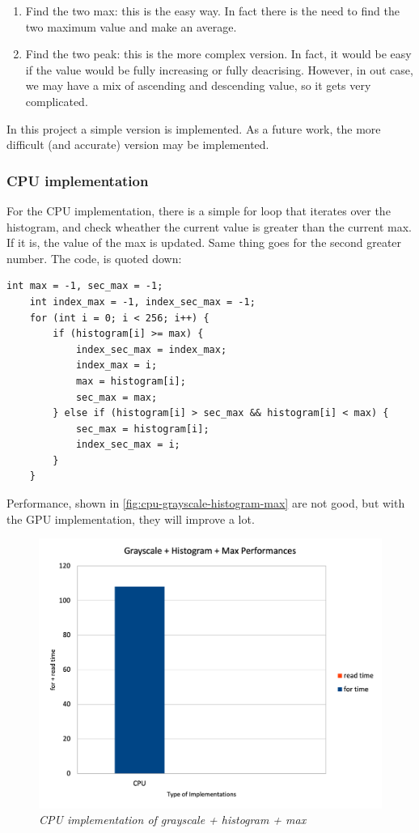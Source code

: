 \documentclass[paper=a4, fontsize=10pt]{scrartcl}	%
\begin{document}
	\begin{enumerate}
		\item Find the two max: this is the easy way. In fact there is the need to find the two maximum value and make an average.
		\item Find the two peak: this is the more complex version. In fact, it would be easy if the value would be fully increasing or fully deacrising. However, in out case, we may have a mix of ascending and descending value, so it gets very complicated.
	\end{enumerate}
				
	In this project a simple version is implemented. As a future work, the more difficult (and accurate) version may be implemented. 

	\subsubsection{CPU implementation}
	
	For the CPU implementation, there is a simple for loop that iterates over the histogram, and check wheather the current value is greater than the current max. If it is, the value of the max is updated. Same thing goes for the second greater number. The code, is quoted down:
	
	\begin{lstlisting}[style=CStyle]
	int max = -1, sec_max = -1;
	int index_max = -1, index_sec_max = -1;
	for (int i = 0; i < 256; i++) {
		if (histogram[i] >= max) {
			index_sec_max = index_max;
			index_max = i;
			max = histogram[i];
			sec_max = max;
		} else if (histogram[i] > sec_max && histogram[i] < max) {
			sec_max = histogram[i];
			index_sec_max = i;
		}
	}
	\end{lstlisting}

	Performance, shown in \autoref{fig:cpu-grayscale-histogram-max} are not good, but with the GPU implementation, they will improve a lot.
	
	\begin{figure}[H]
		\centering
		\includegraphics[width=0.75\linewidth]{images/binarization/max1.png}
		\caption{\textit{CPU implementation of grayscale + histogram + max}}
		\label{fig:cpu-grayscale-histogram-max}
	\end{figure}
\end{document}

